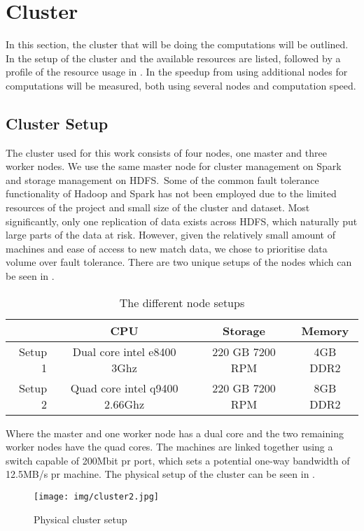\section{Cluster}\label{sec:cluster}
In this section, the cluster that will be doing the computations will be outlined. In  the setup of the cluster and the available resources are listed, followed by a profile of the resource usage in . In  the speedup from using additional nodes for computations will be measured, both using several nodes and computation speed.

\subsection{Cluster Setup}\label{sec:clustersetup}

The cluster used for this work consists of four nodes, one master and three worker nodes. We use the same master node for cluster management on Spark and storage management on HDFS.\ Some of the common fault tolerance functionality of Hadoop and Spark has not been employed due to the limited resources of the project and small size of the cluster and dataset. Most significantly, only one replication of data exists across HDFS, which naturally put large parts of the data at risk. However, given the relatively small amount of machines and ease of access to new match data, we chose to prioritise data volume over fault tolerance. There are two unique setups of the nodes which can be seen in .
\begin{table}[!htb]
  \centering
  \begin{tabular}{|r|ccc|}
    \hline
      & CPU & Storage & Memory \\\hline
    Setup 1 & Dual core intel e8400 3Ghz & 220 GB 7200 RPM & 4GB DDR2 \\
    Setup 2 & Quad core intel q9400 2.66Ghz & 220 GB 7200 RPM & 8GB DDR2 \\\hline
  \end{tabular}
  \caption{The different node setups}\label{tab:setups}
\end{table}

Where the master and one worker node has a dual core and the two remaining worker nodes have the quad cores. The machines are linked together using a switch capable of 200Mbit pr port, which sets a potential one-way bandwidth of 12.5MB/s pr machine. The physical setup of the cluster can be seen in .

\begin{figure}[!htb]
  \centering
    \texttt{[image: img/cluster2.jpg]}
  \caption{Physical cluster setup}\label{fig:clustersetup}
\end{figure}


